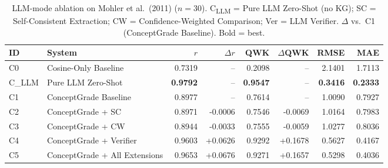 \begin{table}[h]\centering
\caption{LLM-mode ablation on Mohler et al.\ (2011) ($n=30$). C\textsubscript{LLM} = Pure LLM Zero-Shot (no KG); SC = Self-Consistent Extraction; CW = Confidence-Weighted Comparison; Ver = LLM Verifier. $\Delta$ vs.\ C1 (ConceptGrade Baseline). Bold = best.}
\label{tab:llm_ablation}
\begin{tabular}{@{}llrrrrrr@{}}\toprule
\textbf{ID} & \textbf{System} & \textbf{$r$} & \textbf{$\Delta r$} & \textbf{QWK} & \textbf{$\Delta$QWK} & \textbf{RMSE} & \textbf{MAE} \\\midrule
C0 & Cosine-Only Baseline & 0.7319 & -- & 0.2098 & -- & 2.1401 & 1.7113 \\
C_LLM & Pure LLM Zero-Shot & \textbf{0.9792} & -- & \textbf{0.9547} & -- & \textbf{0.3416} & \textbf{0.2333} \\
\midrule
C1 & ConceptGrade Baseline & 0.8977 & -- & 0.7614 & -- & 1.0090 & 0.7927 \\
C2 & ConceptGrade + SC & 0.8971 & -0.0006 & 0.7546 & -0.0069 & 1.0164 & 0.7983 \\
C3 & ConceptGrade + CW & 0.8944 & -0.0033 & 0.7555 & -0.0059 & 1.0277 & 0.8036 \\
C4 & ConceptGrade + Verifier & 0.9603 & +0.0626 & 0.9292 & +0.1678 & 0.5627 & 0.4167 \\
C5 & ConceptGrade + All Extensions & 0.9653 & +0.0676 & 0.9271 & +0.1657 & 0.5298 & 0.4036 \\
\bottomrule\end{tabular}\end{table}